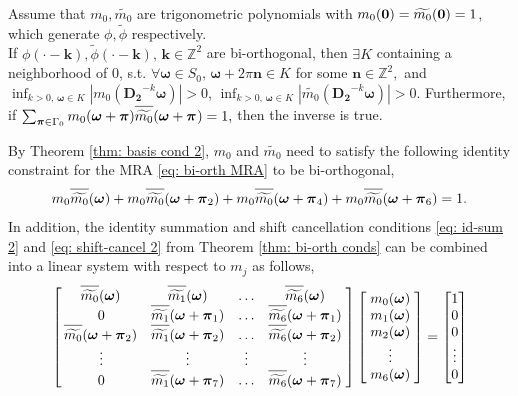 \begin{thm}\label{thm: basis cond 2}
Assume that $m_0, \widetilde{m_0}$ are trigonometric polynomials with $m_0(\boldsymbol{0})=\widetilde{m_0}(\boldsymbol{0}) = 1$, which generate $\phi,\widetilde{\phi}$ respectively.\\
If $\phi(\cdot - \boldsymbol{k}),\widetilde{\phi}(\cdot - \boldsymbol{k}),\,\boldsymbol{k}\in\mathbb{Z}^2$ are bi-orthogonal, then $\exists K$ containing a neighborhood of 0, s.t. $\forall\boldsymbol{\omega}\in S_0,\,\boldsymbol{\omega}+2\pi\mathbf{n}\in K$ for some $\mathbf{n}\in\mathbb{Z}^2, $ and $\inf_{k>0,\,\boldsymbol{\omega}\in K}|m_0(\mathbf{D_2}^{-k}\boldsymbol{\omega})| >0$, $\inf_{k>0,\,\boldsymbol{\omega}\in K}|\widetilde{m_0}(\mathbf{D_2}^{-k}\boldsymbol{\omega})| >0$. 
 Furthermore, if  $\sum_{\boldsymbol{\V{\pi}}\in \Gamma_0} m_0(\boldsymbol{\omega}+\boldsymbol{\pi})\sbarmp{0}{} = 1,$ then the inverse is true.
\end{thm}
By Theorem \ref{thm: basis cond 2}, $m_0$ and $\widetilde{m_0}$ need to satisfy the following identity constraint for the MRA \eqref{eq: bi-orth MRA} to be bi-orthogonal,
\begin{align}\label{eq: identity-cond}
m_0\sbarm{0} + m_0\sbarmp{0}{2} + m_0\sbarmp{0}{4} + m_0\sbarmp{0}{6} = 1.
\end{align}
In addition, the identity summation and shift cancellation conditions \eqref{eq: id-sum 2} and \eqref{eq: shift-cancel 2} from Theorem \ref{thm: bi-orth conds}
 can be combined into a linear system with respect to $m_j$ as follows,
\begin{align}\label{eq: LS-new}
\begin{bmatrix}
    \,\sbarm{0} & \sbarm{1} & \hdots & \sbarm{6}\;  \\
    \;0 & \sbarmp{1}{1}  & \hdots  & \sbarmp{6}{1}\; \\
    \,\sbarmp{0}{2} & \sbarmp{1}{2} & \hdots & \sbarmp{6}{2}\;\\
    \;\vdots & \vdots & \vdots & \vdots \; \\
    \;0 & \sbarmp{1}{7} & \hdots & \sbarmp{6}{7}\;
\end{bmatrix}
\begin{bmatrix}
\;\mo{0}\; \\
\;\mo{1}\; \\
\;\mo{2}\; \\
\; \vdots\; \\
\;\mo{6}\; 
\end{bmatrix} 
=
\begin{bmatrix}
1\\
0\\
0\\
\vdots \\
0
\end{bmatrix}
\end{align}
